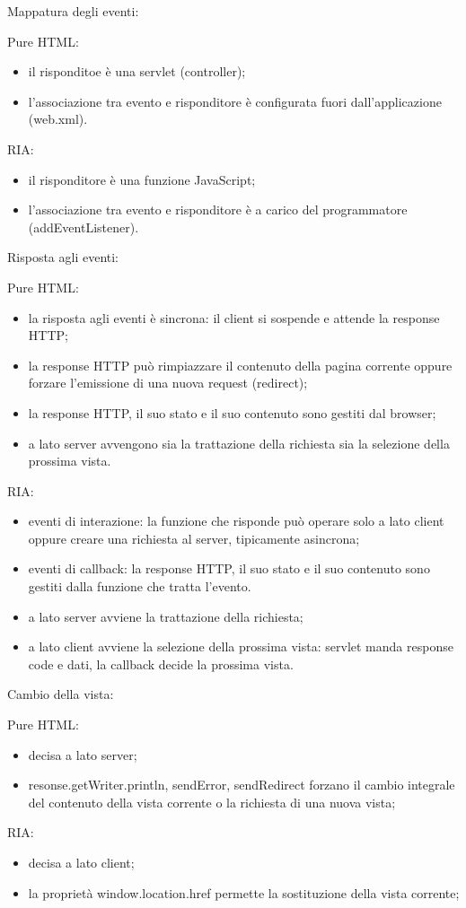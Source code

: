 Mappatura degli eventi:
\begin{multicols}{2}
Pure HTML:
\begin{itemize}
    \item il risponditoe è una servlet (controller);
    \item l'associazione tra evento e risponditore è configurata fuori dall'applicazione (web.xml).
\end{itemize}
\vfill\null
\columnbreak
RIA:
\begin{itemize}
    \item il risponditore è una funzione JavaScript;
    \item l'associazione tra evento e risponditore è a carico del programmatore (addEventListener).
\end{itemize}
\end{multicols}
Risposta agli eventi:
\begin{multicols}{2}
Pure HTML:
\begin{itemize}
    \item la risposta agli eventi è sincrona: il client si sospende e attende la response HTTP;
    \item la response HTTP può rimpiazzare il contenuto della pagina corrente oppure forzare l'emissione di una nuova request (redirect);
    \item la response HTTP, il suo stato e il suo contenuto sono gestiti dal browser;
    \item a lato server avvengono sia la trattazione della richiesta sia la selezione della prossima vista.
\end{itemize}
\vfill\null
\columnbreak
RIA:
\begin{itemize}
    \item eventi di interazione: la funzione che risponde può operare solo a lato client oppure creare una richiesta al server, tipicamente asincrona;
    \item eventi di callback: la response HTTP, il suo stato e il suo contenuto sono gestiti dalla funzione che tratta l'evento.
    \item a lato server avviene la trattazione della richiesta;
    \item a lato client avviene la selezione della prossima vista: servlet manda response code e dati, la callback decide la prossima vista.
\end{itemize}
\end{multicols}
Cambio della vista:
\begin{multicols}{2}
Pure HTML:
\begin{itemize}
    \item decisa a lato server;
    \item resonse.getWriter.println, sendError, sendRedirect forzano il cambio integrale del contenuto della vista corrente o la richiesta di una nuova vista;
\end{itemize}
\vfill\null
\columnbreak
RIA:
\begin{itemize}
    \item decisa a lato client;
    \item la proprietà window.location.href permette la sostituzione della vista corrente;
\end{itemize}
\end{multicols}

